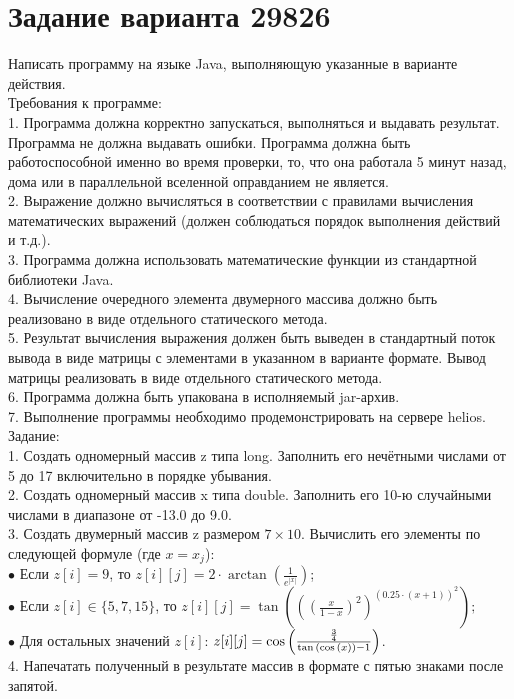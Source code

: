 \section{Задание варианта 29826}
\Large{Написать программу на языке Java, выполняющую указанные в варианте действия. \\
Требования к программе: \\
1. Программа должна корректно запускаться, выполняться и выдавать результат. Программа не должна выдавать ошибки. Программа должна быть работоспособной именно во время проверки, то, что она работала 5 минут назад, дома или в параллельной вселенной оправданием не является. \\
2. Выражение должно вычисляться в соответствии с правилами вычисления математических выражений (должен соблюдаться порядок выполнения действий и т.д.). \\
3. Программа должна использовать математические функции из стандартной библиотеки Java. \\
4. Вычисление очередного элемента двумерного массива должно быть реализовано в виде отдельного статического метода. \\
5. Результат вычисления выражения должен быть выведен в стандартный поток вывода в виде матрицы с элементами в указанном в варианте формате. Вывод матрицы реализовать в виде отдельного статического метода. \\
6. Программа должна быть упакована в исполняемый jar-архив. \\
7. Выполнение программы необходимо продемонстрировать на сервере helios. \\[2mm]
Задание: \\
1. Создать одномерный массив z типа long. Заполнить его нечётными числами от 5 до 17 включительно в порядке убывания. \\[1mm]
2. Создать одномерный массив x типа double. Заполнить его 10-ю случайными числами в диапазоне от -13.0 до 9.0. \\[1mm]
3. Создать двумерный массив z размером $7\times10$. Вычислить его элементы по следующей формуле (где $x = x_{j}$):
\\[1mm]
$\bullet$ Если $z[i] = 9$, то $z[i][j] = 2 \cdot \arctan{\left( {\frac{1}{e^{{\left| x \right|}}}} \right)}$; \\[1mm]
$\bullet$ Если $z[i] \in \{5, 7, 15\}$, то $z[i][j] = \tan{\left({\left( {\left( {\frac{x}{1-x}} \right)}^2 \right)}^{{\left( 0.25\cdot(x+1) \right)}^{2}}\right)};$ \\[1mm]
$\bullet$ Для остальных значений $z[i]$: $z[i][j] = \cos{\left( {\frac{\frac{3}{4}}{\tan{\left( {\cos{\left( {x} \right)}} \right)} - 1}} \right)}$. \\[1mm]
4. Напечатать полученный в результате массив в формате с пятью знаками после запятой.}
\newpage

